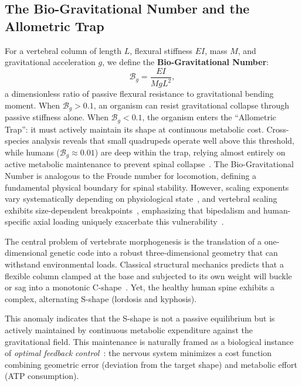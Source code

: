 \subsection{The Bio-Gravitational Number and the Allometric Trap}

For a vertebral column of length $L$, flexural stiffness $EI$, mass $M$, and gravitational acceleration $g$, we define the \textbf{Bio-Gravitational Number}:
\begin{equation}
\mathcal{B}_g = \frac{EI}{M g L^2},
\label{eq:bg_number_passive_supp}
\end{equation}
a dimensionless ratio of passive flexural resistance to gravitational bending moment. When $\mathcal{B}_g > 0.1$, an organism can resist gravitational collapse through passive stiffness alone. When $\mathcal{B}_g < 0.1$, the organism enters the ``Allometric Trap'': it must actively maintain its shape at continuous metabolic cost. Cross-species analysis reveals that small quadrupeds operate well above this threshold, while humans ($\mathcal{B}_g \approx 0.01$) are deep within the trap, relying almost entirely on active metabolic maintenance to prevent spinal collapse~\cite{smit2020adolescent}. The Bio-Gravitational Number is analogous to the Froude number for locomotion, defining a fundamental physical boundary for spinal stability. However, scaling exponents vary systematically depending on physiological state~\cite{glazier2022variable}, and vertebral scaling exhibits size-dependent breakpoints~\cite{smith2024small}, emphasizing that bipedalism and human-specific axial loading uniquely exacerbate this vulnerability~\cite{gorman2009idiopathic}.

The central problem of vertebrate morphogenesis is the translation of a one-dimensional genetic code into a robust three-dimensional geometry that can withstand environmental loads. Classical structural mechanics predicts that a flexible column clamped at the base and subjected to its own weight will buckle or sag into a monotonic C-shape~\cite{goriely2017mathematics}. Yet, the healthy human spine exhibits a complex, alternating S-shape (lordosis and kyphosis).

This anomaly indicates that the S-shape is not a passive equilibrium but is actively maintained by continuous metabolic expenditure against the gravitational field. This maintenance is naturally framed as a biological instance of \emph{optimal feedback control}~\cite{todorov2002optimal}: the nervous system minimizes a cost function combining geometric error (deviation from the target shape) and metabolic effort (ATP consumption).

